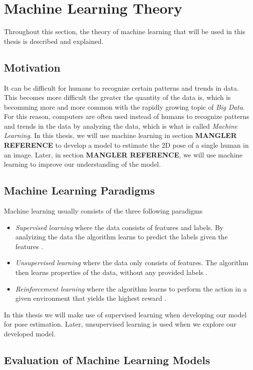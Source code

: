 \documentclass[main.tex]{subfiles}
\begin{document}
\section{Machine Learning Theory}
Throughout this section, the theory of machine learning that will be used in this thesis is described and explained.

\subsection{Motivation}
It can be difficult for humans to recognize certain patterns and trends in data. This becomes more difficult the greater the quantity of the data is, which is becomming more and more common with the rapidly growing topic of \textit{Big Data}. For this reason, computers are often used instead of humans to recognize patterns and trends in the data by analyzing the data, which is what is called \textit{Machine Learning}. In this thesis, we will use machine learning in section \textbf{MANGLER REFERENCE} to develop a model to estimate the 2D pose of a single human in an image. Later, in section \textbf{MANGLER REFERENCE}, we will use machine learning to improve our understanding of the model.

\subsection{Machine Learning Paradigms}
Machine learning usually consists of the three following paradigms
\begin{itemize}
    \item \textit{Supervised learning} where the data consists of features and labels. By analyizing the data the algorithm learns to predict the labels given the features \cite{ESL}.
    \item \textit{Unsupervised learning} where the data only consists of features. The algorithm then learns properties of the data, without any provided labels \cite{ESL}.
    \item \textit{Reinforcement learning} where the algorithm learns to perform the action in a given environment that yields the highest reward \cite{PRML}.
\end{itemize}
In this thesis we will make use of supervised learning when developing our model for pose estimation. Later, unsupervised learning is used when we explore our developed model.

\subsection{Evaluation of Machine Learning Models}
\end{document}
